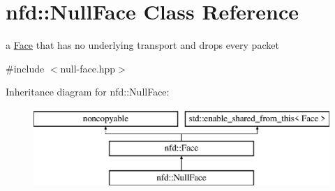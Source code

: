 \hypertarget{classnfd_1_1NullFace}{}\section{nfd\+:\+:Null\+Face Class Reference}
\label{classnfd_1_1NullFace}


a \hyperlink{classnfd_1_1Face}{Face} that has no underlying transport and drops every packet  




{\ttfamily \#include $<$null-\/face.\+hpp$>$}

Inheritance diagram for nfd\+:\+:Null\+Face\+:\begin{figure}[H]
\begin{center}
\leavevmode
\includegraphics[height=3.000000cm]{classnfd_1_1NullFace}
\end{center}
\end{figure}
